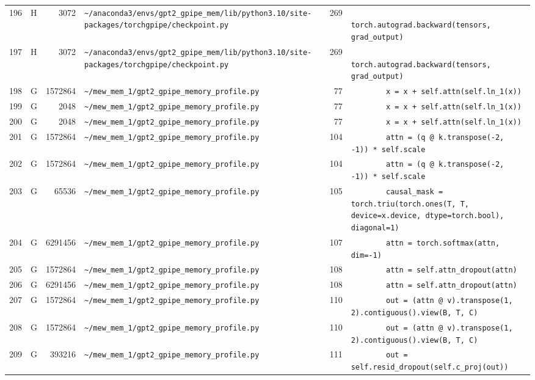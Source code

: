 \documentclass{article}
\begin{document}
\begin{longtable}{r l r p{6.5cm} r p{7.0cm}}
196 & H & 3072 & \lstinline|~/anaconda3/envs/gpt2_gpipe_mem/lib/python3.10/site-packages/torchgpipe/checkpoint.py| & 269 & \lstinline|            torch.autograd.backward(tensors, grad_output)| \\
197 & H & 3072 & \lstinline|~/anaconda3/envs/gpt2_gpipe_mem/lib/python3.10/site-packages/torchgpipe/checkpoint.py| & 269 & \lstinline|            torch.autograd.backward(tensors, grad_output)| \\
198 & G & 1572864 & \lstinline|~/mew_mem_1/gpt2_gpipe_memory_profile.py| & 77 & \lstinline|        x = x + self.attn(self.ln_1(x))| \\
199 & G & 2048 & \lstinline|~/mew_mem_1/gpt2_gpipe_memory_profile.py| & 77 & \lstinline|        x = x + self.attn(self.ln_1(x))| \\
200 & G & 2048 & \lstinline|~/mew_mem_1/gpt2_gpipe_memory_profile.py| & 77 & \lstinline|        x = x + self.attn(self.ln_1(x))| \\
201 & G & 1572864 & \lstinline|~/mew_mem_1/gpt2_gpipe_memory_profile.py| & 104 & \lstinline|        attn = (q @ k.transpose(-2, -1)) * self.scale| \\
202 & G & 1572864 & \lstinline|~/mew_mem_1/gpt2_gpipe_memory_profile.py| & 104 & \lstinline|        attn = (q @ k.transpose(-2, -1)) * self.scale| \\
203 & G & 65536 & \lstinline|~/mew_mem_1/gpt2_gpipe_memory_profile.py| & 105 & \lstinline|        causal_mask = torch.triu(torch.ones(T, T, device=x.device, dtype=torch.bool), diagonal=1)| \\
204 & G & 6291456 & \lstinline|~/mew_mem_1/gpt2_gpipe_memory_profile.py| & 107 & \lstinline|        attn = torch.softmax(attn, dim=-1)| \\
205 & G & 1572864 & \lstinline|~/mew_mem_1/gpt2_gpipe_memory_profile.py| & 108 & \lstinline|        attn = self.attn_dropout(attn)| \\
206 & G & 6291456 & \lstinline|~/mew_mem_1/gpt2_gpipe_memory_profile.py| & 108 & \lstinline|        attn = self.attn_dropout(attn)| \\
207 & G & 1572864 & \lstinline|~/mew_mem_1/gpt2_gpipe_memory_profile.py| & 110 & \lstinline|        out = (attn @ v).transpose(1, 2).contiguous().view(B, T, C)| \\
208 & G & 1572864 & \lstinline|~/mew_mem_1/gpt2_gpipe_memory_profile.py| & 110 & \lstinline|        out = (attn @ v).transpose(1, 2).contiguous().view(B, T, C)| \\
209 & G & 393216 & \lstinline|~/mew_mem_1/gpt2_gpipe_memory_profile.py| & 111 & \lstinline|        out = self.resid_dropout(self.c_proj(out))| \\

\end{longtable}
\end{document}
